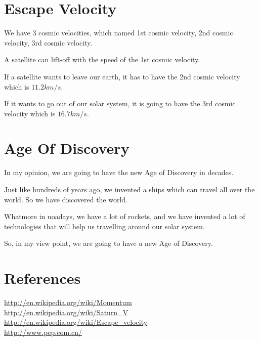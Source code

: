 \documentclass[UTF8,12pt]{ctexart}
\begin{document}
\section{Escape Velocity}
We have 3 cosmic velocities, which named 1st cosmic velocity, 2nd cosmic velocity, 3rd cosmic velocity.

A satellite can lift-off with the speed of the 1st cosmic velocity.

If a satellite wants to leave our earth, it has to have the 2nd cosmic velocity which is $11.2km/s$.

If it wants to go out of our solar system, it is going to have the 3rd cosmic velocity which is $16.7km/s$.
\section{Age Of Discovery}
In my opinion, we are going to have the new Age of Discovery in decades.

Just like hundreds of years ago, we invented a ships which can travel all over the world. So we have discovered the world.

Whatmore in noadays, we have a lot of rockets, and we have invented a lot of technologies that will help us travelling around our solar system.

So, in my view point, we are going to have a new Age of Discovery.
\section{References}
\noindent
\url{http://en.wikipedia.org/wiki/Momentum}\\
\url{http://en.wikipedia.org/wiki/Saturn_V}\\
\url{http://en.wikipedia.org/wiki/Escape_velocity}\\
\url{http://www.pep.com.cn/}
\paragraph{}
\end{document}
